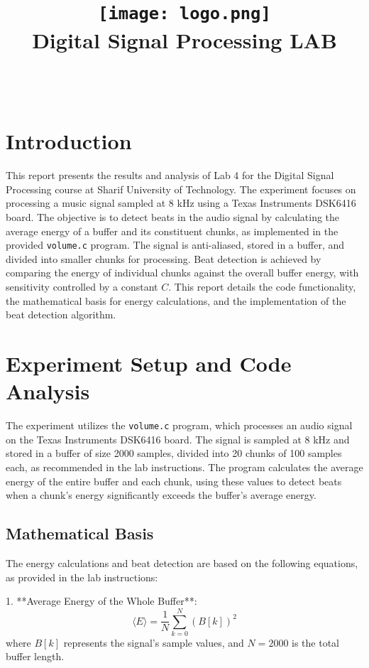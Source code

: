\documentclass{article}
\title{
    \texttt{[image: logo.png]} \\ %
    Digital Signal Processing LAB\par \exerciseset
}
\author{\FirstAuthor \\ \SecondAuthor}
\date{}
\begin{document}
\maketitle

\section*{Introduction}
This report presents the results and analysis of Lab 4 for the Digital Signal Processing course at Sharif University of Technology. The experiment focuses on processing a music signal sampled at 8 kHz using a Texas Instruments DSK6416 board. The objective is to detect beats in the audio signal by calculating the average energy of a buffer and its constituent chunks, as implemented in the provided \texttt{volume.c} program. The signal is anti-aliased, stored in a buffer, and divided into smaller chunks for processing. Beat detection is achieved by comparing the energy of individual chunks against the overall buffer energy, with sensitivity controlled by a constant $C$. This report details the code functionality, the mathematical basis for energy calculations, and the implementation of the beat detection algorithm.

\section*{Experiment Setup and Code Analysis}
The experiment utilizes the \texttt{volume.c} program, which processes an audio signal on the Texas Instruments DSK6416 board. The signal is sampled at 8 kHz and stored in a buffer of size 2000 samples, divided into 20 chunks of 100 samples each, as recommended in the lab instructions. The program calculates the average energy of the entire buffer and each chunk, using these values to detect beats when a chunk's energy significantly exceeds the buffer's average energy.

\subsection*{Mathematical Basis}
The energy calculations and beat detection are based on the following equations, as provided in the lab instructions:

1. **Average Energy of the Whole Buffer**:
   \begin{equation}
   \langle E \rangle = \frac{1}{N} \sum_{k=0}^{N} (B[k])^2
   \end{equation}
   where $B[k]$ represents the signal's sample values, and $N=2000$ is the total buffer length.
\end{document}
